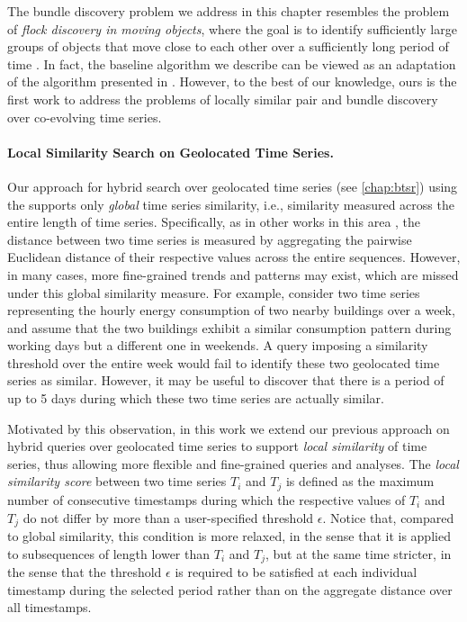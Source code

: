 The bundle discovery problem we address in this chapter resembles the problem of \textit{flock discovery in moving objects}, where the goal is to identify sufficiently large groups of objects that move close to each other over a sufficiently long period of time \cite{gudmundsson2006computing, benkert2008reporting, vieira2009line, tanaka2015efficient}. In fact, the baseline algorithm we describe can be viewed as an adaptation of the algorithm presented  in \cite{vieira2009line}. However, to the best of our knowledge, ours is the first work to address the problems of locally similar pair and bundle discovery over co-evolving time series. 

\paragraph{Local Similarity Search on Geolocated Time Series.} Our approach for hybrid search over geolocated time series (see \ref{chap:btsr}) using the \btsr supports only {\em global} time series similarity, i.e., similarity measured across the entire length of time series. Specifically, as in other works in this area \cite{DBLP:journals/pvldb/EchihabiZPB18,jessica2007dmkd,camerra2010icdm,camerra2014kais}, the distance between two time series is measured by aggregating the pairwise Euclidean distance of their respective values across the entire sequences. However, in many cases, more fine-grained trends and patterns may exist, which are missed under this global similarity measure. For example, consider two time series representing the hourly energy consumption of two nearby buildings over a week, and assume that the two buildings exhibit a similar consumption pattern during working days but a different one in weekends. A query imposing a similarity threshold over the entire week would fail to identify these two geolocated time series as similar. However, it may be useful to discover that there is a period of up to 5 days during which these two time series are actually similar.

Motivated by this observation, in this work we extend our previous approach on hybrid queries over geolocated time series to support {\em local similarity} of time series, thus allowing more flexible and fine-grained queries and analyses. The {\em local similarity score} between two time series $T_i$ and $T_j$ is defined as the maximum number of consecutive timestamps during which the respective values of $T_i$ and $T_j$ do not differ by more than a user-specified threshold $\epsilon$. Notice that, compared to global similarity, this condition is more relaxed, in the sense that it is applied to subsequences of length lower than $T_i$ and $T_j$, but at the same time stricter, in the sense that the threshold $\epsilon$ is required to be satisfied at each individual timestamp during the selected period rather than on the aggregate distance over all timestamps.

